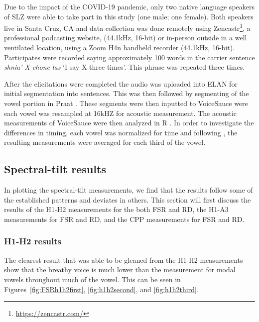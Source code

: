 \documentclass[12pt, letterpaper]{article}
\begin{document}
Due to the impact of the COVID-19 pandemic, only two native language speakers of SLZ were able to take part in this study (one male; one female). Both speakers live in Santa Cruz, CA and data collection was done remotely using Zencastr\footnote{\href{https://zencastr.com/}{https://zencastr.com/}}, a professional podcasting website, (44.1kHz, 16-bit) or in-person outside in a well ventilated location, using a Zoom H4n handheld recorder (44.1kHz, 16-bit). Participates were recorded saying approximately 100 words in the carrier sentence \textit{shnia' X chone las} `I say X three times'. This phrase was repeated three times. 

After the elicitations were completed the audio was uploaded into ELAN \citep{wittenburgELANProfessionalFramework2006} for initial segmentation into sentences. This was then followed by segmenting of the vowel portion in Praat \citep{boersmaPraatDoingPhonetics2021}. These segments were then inputted to VoiceSauce \citep{shueVOICESAUCEProgramVoice2009} were each vowel was resampled at 16kHZ for acoustic measurement. The acoustic measurements of VoiceSauce were then analyzed in R \citep{rcoreteamLanguageEnvironmentStatistical2021}. In order to investigate the differences in timing, each vowel was normalized for time and following \citet{garellekAcousticConsequencesPhonation2011}, the resulting measurements were averaged for each third of the vowel. 

\subsection{Spectral-tilt results} \label{sec:Results}

In plotting the spectral-tilt measurements, we find that the results follow some of the established patterns and deviates in others. This section will first discuss the results of the H1-H2 measurements for the both FSR and RD, the H1-A3 measurements for FSR and RD, and the CPP measurements for FSR and RD. 

\subsubsection{H1-H2 results} \label{sec:H1H2}

The clearest result that was able to be gleaned from the H1-H2 measurements show that the breathy voice is much lower than the measurement for modal vowels throughout much of the vowel. This can be seen in Figures~\ref{fig:FSRh1h2first}, \ref{fig:h1h2second}, and \ref{fig:h1h2third}.
\end{document}
